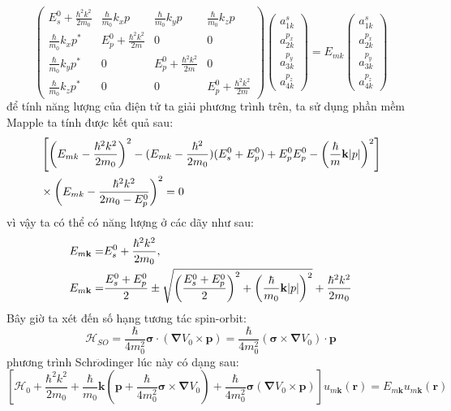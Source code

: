 \begin{equation}
\begin{pmatrix}
E_s^0+\frac{\hbar^2 k^2}{2m_0} & \frac{\hbar}{m_0}k_xp & \frac{\hbar}{m_0}k_yp & \frac{\hbar}{m_0}k_zp \\
\frac{\hbar}{m_0}k_xp^* & E_p^0+\frac{\hbar^2 k^2}{2m} & 0 & 0 \\
\frac{\hbar}{m_0}k_yp^* & 0 & E_p^0+\frac{\hbar^2 k^2}{2m}  & 0 \\
\frac{\hbar}{m_0}k_zp^* & 0 &0 & E_p^0+\frac{\hbar^2 k^2}{2m}  
\end{pmatrix}
\begin{pmatrix}
a_{1k}^s \\
 a_{2k}^{p_x} \\
  a_{3k}^{p_y} \\
   a_{4k}^{p_z}
\end{pmatrix}
=E_{mk}\begin{pmatrix}
a_{1k}^s \\
 a_{2k}^{p_x} \\
  a_{3k}^{p_y} \\
   a_{4k}^{p_z}
\end{pmatrix}
\end{equation}
để tính năng lượng của điện tử ta giải phương trình trên, ta sử dụng phần mềm Mapple ta tính được kết quả sau:
\begin{align}
&\left[\left(E_{mk} -\frac{\hbar^2 k^2}{2m_0}\right)^2 - (E_{mk}-\frac{\hbar^2}{2m_0})(E_s^0+E_p^0)+E_p^0E_p^0 -\left(\frac{\hbar}{m}\mathbf{k}|p|\right)^2 \right]\notag \\
&\times \left(E_{mk} -\frac{\hbar^2 k^2}{2m_0 -E_p^0} \right)^2 =0
\end{align}
vì vậy ta có thể có năng lượng ở các dãy như sau:
\begin{align}
E_{m\mathbf{k}}=&E_s^0 +\frac{\hbar^2 k^2}{2m_0},\notag \\
E_{m\mathbf{k}}=&\frac{E_s^0 +E_p^0}{2} \pm \sqrt{\left(\frac{E_s^0 +E_p^0}{2}\right)^2 +\left(\frac{\hbar}{m_0}\mathbf{k}|p|\right)^2}+\frac{\hbar^2 k^2}{2m_0}
\end{align}
Bây giờ ta xét đến số hạng  tương tác spin-orbit:
\begin{equation}
\mathcal{H}_{SO} = \frac{\hbar}{4m^2_0}\boldsymbol{\sigma} \cdot \left(\boldsymbol{\nabla} V_0\times \boldsymbol{p} \right) =  \frac{\hbar}{4m^2_0}\left(\boldsymbol{\sigma}\times \boldsymbol{\nabla}V_0\right)\cdot\boldsymbol{p}
\end{equation}
phương trình Schr$\ddot{o}$dinger lúc này có dạng sau:
\begin{equation}
\left[\mathcal{H}_0+\frac{{\hbar}^2k^2}{2m_0}+\frac{\hbar}{m_0}\boldsymbol{k}\left(\boldsymbol{p}+\frac{\hbar}{4m^2_0}\boldsymbol{\sigma}\times\boldsymbol{\nabla} V_0 \right)+\frac{\hbar}{4m^2_0}\boldsymbol{\sigma}\left(\boldsymbol{\nabla} V_0\times \boldsymbol{p} \right)\right]u_{m\mathbf{k}}(\mathbf{r}) = E_{m\mathbf{k}}u_{m\mathbf{k}}(\mathbf{r})
\end{equation}
